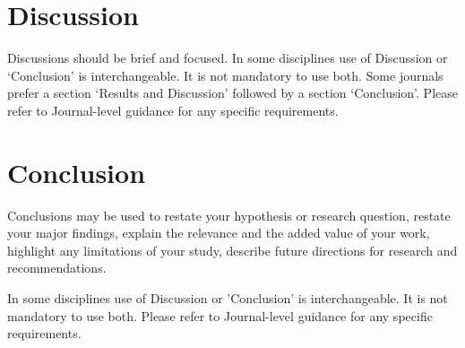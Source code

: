 \section{Discussion}

Discussions should be brief and focused. In some disciplines use of Discussion or ‘Conclusion’ is interchangeable. It is not mandatory to use both. Some journals prefer a section ‘Results and Discussion’ followed by a section ‘Conclusion’. Please refer to Journal-level guidance for any specific requirements.

\section{Conclusion}

Conclusions may be used to restate your hypothesis or research question, restate your major findings, explain the relevance and the added value of your work, highlight any limitations of your study, describe future directions for research and recommendations.

In some disciplines use of Discussion or ’Conclusion’ is interchangeable. It is not mandatory to use both. Please refer to Journal-level guidance for any specific requirements.
